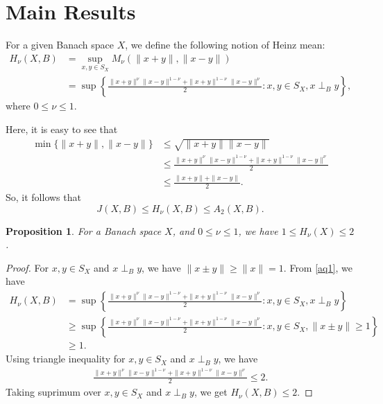 \documentclass[preprint,12pt]{elsarticle}
\newtheorem{proposition}[thm]{Proposition}
\numberwithin{equation}{section}
\begin{document}
\section{Main Results}

 For a given Banach space $X$, we define the following notion of Heinz mean:
\begin{align}\label{aq1}
\nonumber H_{\nu}(X,B) &= \sup_{x,y \in S_X} M_{\nu}( \|x+y\|, \|x-y\|)\\
&= \sup\left\{\frac{\|x+y\|^{\nu}\|x-y\|^{1-\nu} + \|x+y\|^{1-\nu}\|x-y\|^{\nu}}{2}: x,y \in S_X, x\perp_B y\right\},
\end{align}
where $0 \leq \nu \leq 1$.

\noindent Here, it is easy to see that
\begin{align*}
\min\{\|x+y\|, \|x-y\|\} &\leq \sqrt{\|x+y\| \|x-y\|}\\
&\leq \frac{\|x+y\|^{\nu}\|x-y\|^{1-\nu} + \|x+y\|^{1-\nu}\|x-y\|^{\nu}}{2}\\
&\leq \frac{\|x+y\| + \|x-y\|}{2}.
\end{align*}
So, it follows that
\begin{equation}\label{eq1}
J(X,B) \leq H_{\nu}(X,B) \leq A_2(X,B).
\end{equation}
\begin{proposition}\label{j1}
For a Banach space $X$, and $0 \leq \nu \leq 1$, we have $1 \leq H_{\nu}(X) \leq 2$.
\end{proposition}
\begin{proof}
  For $x,y \in S_X$ and $x\perp_B y$, we have $\|x\pm y\|\geq \|x\|=1$. From \eqref{aq1}, we have 
 \begin{align*}
 H_{\nu}(X,B)&= \sup\left\{\frac{\|x+y\|^{\nu}\|x-y\|^{1-\nu} + \|x+y\|^{1-\nu}\|x-y\|^{\nu}}{2}: x,y \in S_X, x\perp_B y\right\}\\
 &\geq \sup\left\{\frac{\|x+y\|^{\nu}\|x-y\|^{1-\nu} + \|x+y\|^{1-\nu}\|x-y\|^{\nu}}{2}: x,y \in S_X, \|x\pm y\|\geq 1 \right\}\\
 &\geq 1.    
 \end{align*}
 Using triangle inequality for $x,y \in S_X$ and $x\perp_B y$, we have
  \begin{align*}
 \frac{\|x+y\|^{\nu}\|x-y\|^{1-\nu} + \|x+y\|^{1-\nu}\|x-y\|^{\nu}}{2}\leq 2.    
\end{align*}
Taking suprimum over $x,y \in S_X$ and $x\perp_B y$, we get  $H_{\nu}(X,B)\leq 2$.
\end{proof}
\end{document}
